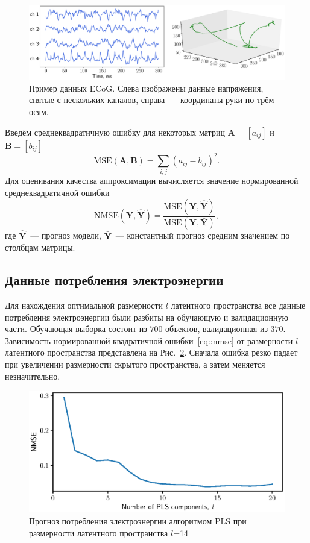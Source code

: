 \documentclass[12pt,twoside]{article}
\newcommand{\bY}{\mathbf{Y}}
\begin{document}
\begin{figure}
	\includegraphics[width=\linewidth]{figs/ecog_data.eps}
	\caption{Пример данных ECoG. Слева изображены данные напряжения, снятые с нескольких каналов, справа~--- координаты руки по трём осям.}
	\label{fig::ecog_data}
\end{figure}

Введём среднеквадратичную ошибку для некоторых матриц $\mathbf{A} = [a_{ij}]$ и $\mathbf{B} = [b_{ij}]$
\[
\text{MSE} (\mathbf{A}, \mathbf{B}) = \sum_{i,j} (a_{ij} - b_{ij})^2.
\]
Для оценивания качества аппроксимации вычисляется значение нормированной среднеквадратичной ошибки
\begin{equation}
\text{NMSE}(\bY,  \mathbf{\hat{Y}}) = \frac{\text{MSE} (\bY, \mathbf{\hat{Y}})}{\text{MSE} (\bY, \mathbf{\bar{Y}})},
\label{eq::nmse}
\end{equation}
где $\mathbf{\hat{Y}}$~--- прогноз модели, $\mathbf{\bar{Y}}$~--- константный прогноз средним значением по столбцам матрицы.

\subsection{Данные потребления электроэнергии}

Для нахождения оптимальной размерности $l$ латентного пространства все данные потребления электроэнергии были разбиты на обучающую и валидационную части. 
Обучающая выборка состоит из $700$ объектов, валидационная из $370$. Зависимость нормированной квадратичной ошибки~\eqref{eq::nmse} от размерности $l$ латентного пространства представлена на Рис.~\ref{fig::energy_n_comp}. 
Сначала ошибка резко падает при увеличении размерности скрытого пространства, а затем меняется незначительно.

\begin{figure}[!h]
	\centering
	\includegraphics[width=0.75\linewidth]{figs/energy_n_comp}
	\caption{Прогноз потребления электроэнергии алгоритмом PLS при размерности латентного пространства $l$=14}
	\label{fig::energy_n_comp}
\end{figure}
\end{document}
